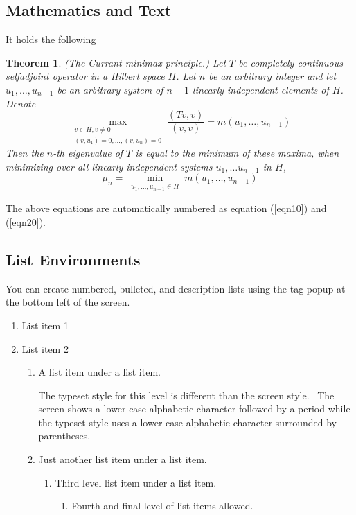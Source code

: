 \documentclass{article}%
\newtheorem{theorem}{Theorem}
\begin{document}
\subsection{Mathematics and Text}

It holds \cite{KarelRektorys} the following
\begin{theorem}
(The Currant minimax principle.) Let $T$ be completely continuous selfadjoint operator
in a Hilbert space $H$. Let $n$ be an arbitrary integer and let $u_1,\ldots,u_{n-1}$ be
an arbitrary system of $n-1$ linearly independent elements of $H$. Denote
\begin{equation}
\max_{\substack{v\in H, v\neq
0\\(v,u_1)=0,\ldots,(v,u_n)=0}}\frac{(Tv,v)}{(v,v)}=m(u_1,\ldots, u_{n-1})
\label{eqn10}
\end{equation}
Then the $n$-th eigenvalue of $T$ is equal to the minimum of these maxima, when
minimizing over all linearly independent systems $u_1,\ldots u_{n-1}$ in $H$,
\begin{equation}
\mu_n = \min_{\substack{u_1,\ldots, u_{n-1}\in H}} m(u_1,\ldots, u_{n-1}) \label{eqn20}
\end{equation}
\end{theorem}
The above equations are automatically numbered as equation (\ref{eqn10}) and
(\ref{eqn20}).

\subsection{List Environments}

You can create numbered, bulleted, and description lists using the tag popup
at the bottom left of the screen.

\begin{enumerate}
\item List item 1

\item List item 2

\begin{enumerate}
\item A list item under a list item.

The typeset style for this level is different than the screen style. \ The
screen shows a lower case alphabetic character followed by a period while the
typeset style uses a lower case alphabetic character surrounded by parentheses.

\item Just another list item under a list item.

\begin{enumerate}
\item Third level list item under a list item.

\begin{enumerate}
\item Fourth and final level of list items allowed.
\end{enumerate}
\end{enumerate}
\end{enumerate}
\end{enumerate}
\end{document}
